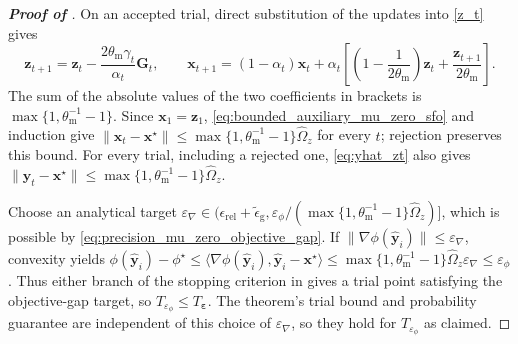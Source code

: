 \documentclass{article}
\begin{document}
\begin{proof}[\textbf{Proof of }]
\label{proof:mu_zero_objective_gap}
On an accepted trial, direct substitution of the updates into
\eqref{z_t} gives
\[
\bm{z}_{t+1}=\bm{z}_t-\frac{2\theta_{\mathrm{m}}\gamma_t}{\alpha_t}\mathbf{G}_t,
\qquad
\bm{x}_{t+1}=(1-\alpha_t)\bm{x}_t+
\alpha_t\left[\left(1-\frac1{2\theta_{\mathrm{m}}}\right)\bm{z}_t
+\frac{\bm{z}_{t+1}}{2\theta_{\mathrm{m}}}\right].
\]
The sum of the absolute values of the two coefficients in brackets
is \(\max\{1,\theta_{\mathrm{m}}^{-1}-1\}\). Since \(\bm{x}_1=\bm{z}_1\),
\eqref{eq:bounded_auxiliary_mu_zero_sfo} and induction give
\(\|\bm{x}_t-\bm{x}^\star\|\le\max\{1,\theta_{\mathrm{m}}^{-1}-1\}\widehat\Omega_z\) for every \(t\);
rejection preserves this bound. For every trial, including a rejected
one, \eqref{eq:yhat_zt} also gives
\(\|\hat {\bm{y}}_t-\bm{x}^\star\|\le\max\{1,\theta_{\mathrm{m}}^{-1}-1\}\widehat\Omega_z\).

Choose an analytical target
\(\varepsilon_\nabla\in
(\epsilon_{\mathrm{rel}}+\widetilde\epsilon_{\mathrm{g}},
\varepsilon_\phi/(\max\{1,\theta_{\mathrm{m}}^{-1}-1\}\widehat\Omega_z)]\), which is possible by
\eqref{eq:precision_mu_zero_objective_gap}.
If \(\|\nabla\phi(\hat {\bm{y}}_i)\|\le\varepsilon_\nabla\),
convexity yields
\(\phi(\hat {\bm{y}}_i)-\phi^\star
\le\langle\nabla\phi(\hat {\bm{y}}_i),\hat {\bm{y}}_i-\bm{x}^\star\rangle
\le\max\{1,\theta_{\mathrm{m}}^{-1}-1\}\widehat\Omega_z\varepsilon_\nabla
\le\varepsilon_\phi\).
Thus either branch of the stopping criterion in
 gives a trial point satisfying the
objective-gap target, so
\(T_{\varepsilon_\phi}\le T_{\boldsymbol\varepsilon}\).
The theorem's trial bound and probability guarantee are independent
of this choice of \(\varepsilon_\nabla\), so they hold for
\(T_{\varepsilon_\phi}\) as claimed.
\end{proof}
\end{document}
